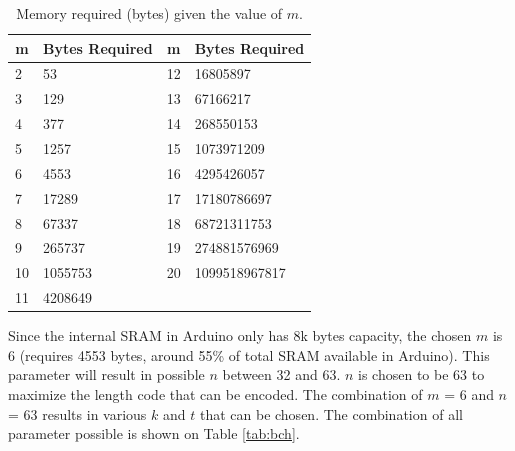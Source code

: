 \begin{table}[htbp]
  \centering
  \caption{Memory required (bytes) given the value of $m$.}
    \begin{tabular}{|l|l|l|l|}
    \hline
    \multicolumn{1}{|c|}{\textbf{m}} & \multicolumn{1}{c|}{\textbf{Bytes Required}} & \multicolumn{1}{c|}{\textbf{m}} & \multicolumn{1}{c|}{\textbf{Bytes Required}} \\
    \hline
    2     & 53    & 12    & 16805897 \\
    \hline
    3     & 129   & 13    & 67166217 \\
    \hline
    4     & 377   & 14    & 268550153 \\
    \hline
    5     & 1257  & 15    & 1073971209 \\
    \hline
    6     & 4553  & 16    & 4295426057 \\
    \hline
    7     & 17289 & 17    & 17180786697 \\
    \hline
    8     & 67337 & 18    & 68721311753 \\
    \hline
    9     & 265737 & 19    & 274881576969 \\
    \hline
    10    & 1055753 & 20    & 1099518967817 \\
    \hline
    11    & 4208649 &       &  \\
    \hline
    \end{tabular}%
  \label{tab:memorybch}%
\end{table}%

Since the internal SRAM in Arduino only has 8k bytes capacity, the chosen $m$ is 6 (requires 4553 bytes, around 55\% of total SRAM available in Arduino). This parameter will result in possible $n$ between 32 and 63. $n$ is chosen to be 63 to maximize the length code that can be encoded.
The combination of $m$ = 6 and $n$ = 63 results in various $k$ and $t$ that can be chosen. The combination of all parameter possible is shown on Table \ref{tab:bch}.

